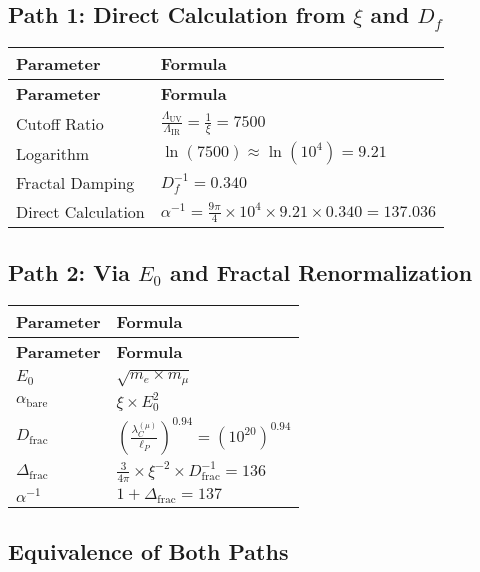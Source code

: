 \documentclass[12pt,a4paper]{article}
\begin{document}
	\subsection{Path 1: Direct Calculation from \(\xi\) and \(D_f\)}
	
	\begin{longtable}{|p{4cm}|p{6cm}|}
		\hline
		\textbf{Parameter} & \textbf{Formula} \\
		\hline
		\endfirsthead
		\hline
		\textbf{Parameter} & \textbf{Formula} \\
		\hline
		\endhead
		Cutoff Ratio & \(\frac{\Lambda_{\text{UV}}}{\Lambda_{\text{IR}}} = \frac{1}{\xi} = 7500\) \\
		\hline
		Logarithm & \(\ln(7500) \approx \ln(10^4) = 9.21\) \\
		\hline
		Fractal Damping & \(D_f^{-1} = 0.340\) \\
		\hline
		Direct Calculation & \(\alpha^{-1} = \frac{9\pi}{4} \times 10^4 \times 9.21 \times 0.340 = 137.036\) \\
		\hline
	\end{longtable}
	
	\subsection{Path 2: Via \(E_0\) and Fractal Renormalization}
	
	\begin{longtable}{|p{3cm}|p{5cm}|}
		\hline
		\textbf{Parameter} & \textbf{Formula} \\
		\hline
		\endfirsthead
		\hline
		\textbf{Parameter} & \textbf{Formula} \\
		\hline
		\endhead
		\(E_0\) & \(\sqrt{m_e \times m_{\mu}}\) \\
		\hline
		\(\alpha_{\text{bare}}\) & \(\xi \times E_0^2\) \\
		\hline
		\(D_{\text{frac}}\) & \(\left(\frac{\lambda_C^{(\mu)}}{\ell_P}\right)^{0.94} = (10^{20})^{0.94}\) \\
		\hline
		\(\Delta_{\text{frac}}\) & \(\frac{3}{4\pi} \times \xi^{-2} \times D_{\text{frac}}^{-1} = 136\) \\
		\hline
		\(\alpha^{-1}\) & \(1 + \Delta_{\text{frac}} = 137\) \\
		\hline
	\end{longtable}
	
	\subsection{Equivalence of Both Paths}
	
\end{document}
